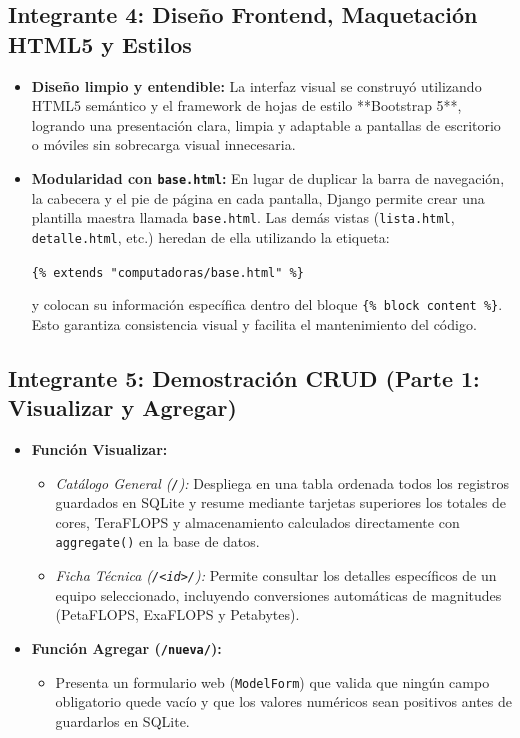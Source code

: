 \documentclass[11pt,a4paper]{article}
\begin{document}
\newpage
\subsection{Integrante 4: Diseño Frontend, Maquetación HTML5 y Estilos}
\begin{itemize}
    \item \textbf{Diseño limpio y entendible:} La interfaz visual se construyó utilizando HTML5 semántico y el framework de hojas de estilo **Bootstrap 5**, logrando una presentación clara, limpia y adaptable a pantallas de escritorio o móviles sin sobrecarga visual innecesaria.
    \item \textbf{Modularidad con \texttt{base.html}:} En lugar de duplicar la barra de navegación, la cabecera y el pie de página en cada pantalla, Django permite crear una plantilla maestra llamada \texttt{base.html}. Las demás vistas (\texttt{lista.html}, \texttt{detalle.html}, etc.) heredan de ella utilizando la etiqueta:
    \begin{center}
        \texttt{\{\% extends "computadoras/base.html" \%\}}
    \end{center}
    y colocan su información específica dentro del bloque \texttt{\{\% block content \%\}}. Esto garantiza consistencia visual y facilita el mantenimiento del código.
\end{itemize}

\subsection{Integrante 5: Demostración CRUD (Parte 1: Visualizar y Agregar)}
\begin{itemize}
    \item \textbf{Función Visualizar:}
    \begin{itemize}
        \item \textit{Catálogo General (\texttt{/}):} Despliega en una tabla ordenada todos los registros guardados en SQLite y resume mediante tarjetas superiores los totales de cores, TeraFLOPS y almacenamiento calculados directamente con \texttt{aggregate()} en la base de datos.
        \item \textit{Ficha Técnica (\texttt{/<id>/}):} Permite consultar los detalles específicos de un equipo seleccionado, incluyendo conversiones automáticas de magnitudes (PetaFLOPS, ExaFLOPS y Petabytes).
    \end{itemize}
    \item \textbf{Función Agregar (\texttt{/nueva/}):}
    \begin{itemize}
        \item Presenta un formulario web (\texttt{ModelForm}) que valida que ningún campo obligatorio quede vacío y que los valores numéricos sean positivos antes de guardarlos en SQLite.
    \end{itemize}
\end{itemize}
\end{document}
